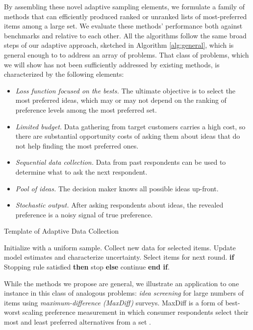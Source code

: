 \documentclass[blindrev,mnsc]{informs3}
\begin{document}
By assembling these novel adaptive sampling elements, we formulate a family of methods that can efficiently produced ranked or unranked lists of most-preferred items among a large set. We evaluate these methods' performance both against benchmarks and relative to each other. All the algorithms follow the same broad steps of our adaptive approach, sketched in Algorithm \ref{alg:general}, which is general enough to to address an array of problems. That class of problems, which we will show has not been sufficiently addressed by existing methods, is characterized by the following elements:

\begin{itemize}
\item \emph{Loss function focused on the bests.} The ultimate objective is to select the most preferred ideas, which may or may not depend on the ranking of preference levels among the most preferred set.
\item \emph{Limited budget.} Data gathering from target customers carries a high cost, so there are substantial opportunity costs of asking them about ideas that do not help finding the most preferred ones.
\item \emph{Sequential data collection.} Data from past respondents can be used to determine what to ask the next respondent.
\item \emph{Pool of ideas.} The decision maker knows all possible ideas up-front.
\item \emph{Stochastic output.} After asking respondents about ideas, the revealed preference is a noisy signal of true preference.
\end{itemize}

\begin{algorithm} 
\caption{Template of Adaptive Data Collection} \label{alg:general}
\begin{algorithmic}[1]
\State Initialize with a uniform sample.
\State Collect new data for selected items.
\State Update model estimates and characterize uncertainty.
\State Select items for next round.
\State \textbf{if} {Stopping rule satisfied} \textbf{then} stop \textbf{else} continue \textbf{end if}.
\EndFor
\end{algorithmic}
\end{algorithm}

While the methods we propose are general, we illustrate an application to one instance in this class of analogous problems: \emph{idea screening} for large numbers of items using \emph{maximum-difference (MaxDiff)} surveys. MaxDiff is a form of best-worst scaling preference measurement in which consumer respondents select their most and least preferred alternatives from a set \citep{marley2005some}. 
\end{document}
